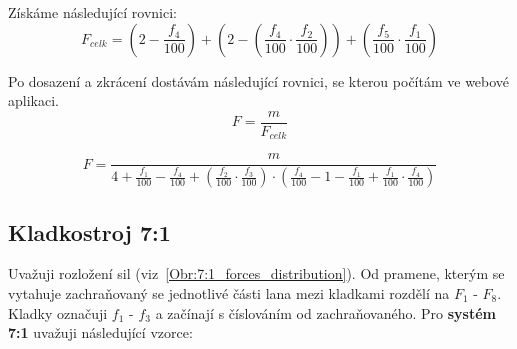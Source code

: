 \noindent Získáme následující rovnici:
\begin{equation}
    \label{eqn:8_calculation_5_1}
    F_{celk} = (2 - \frac{f_4}{100}) + (2 - (\frac{f_4}{100} \cdot \frac{f_2}{100})) + (\frac{f_5}{100} \cdot \frac{f_1}{100})
\end{equation}

\noindent Po dosazení a zkrácení dostávám následující rovnici, se kterou počítám ve webové aplikaci.
\begin{equation}
    \label{eqn:9_calculation_5_1}
    F = \frac{m}{F_{celk}}
\end{equation}

\begin{equation}
    \label{eqn:10_calculation_5_1}
    F = \frac{m}{4 + \frac{f_1}{100} - \frac{f_4}{100} + (\frac{f_2}{100} \cdot \frac{f_3}{100}) \cdot (\frac{f_4}{100} - 1 - \frac{f_1}{100} + \frac{f_1}{100} \cdot \frac{f_4}{100})}
\end{equation}
\subsection{Kladkostroj 7:1}
Uvažuji rozložení sil (viz~\autoref{Obr:7:1_forces_distribution}). Od pramene, kterým se vytahuje zachraňovaný se jednotlivé části lana mezi kladkami rozdělí na ${F_1}$ - ${F_8}$. Kladky označuji ${f_1}$ - ${f_3}$ a začínají s číslováním od zachraňovaného. Pro \textbf{systém 7:1} uvažuji následující vzorce:

